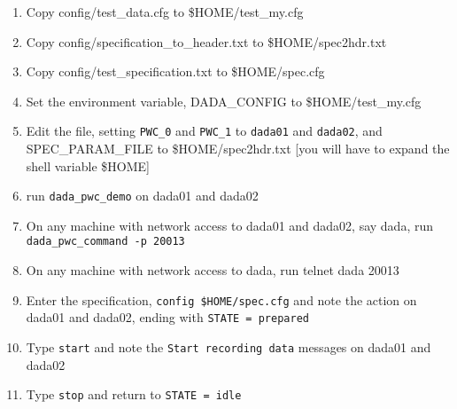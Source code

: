 \begin{enumerate}

\item Copy config/test\_data.cfg to \$HOME/test\_my.cfg

\item Copy config/specification\_to\_header.txt to \$HOME/spec2hdr.txt

\item Copy config/test\_specification.txt to \$HOME/spec.cfg

\item Set the environment variable, DADA\_CONFIG to \$HOME/test\_my.cfg

\item Edit the file, setting {\tt PWC\_0} and {\tt PWC\_1} to {\tt dada01}
	and {\tt dada02}, and SPEC\_PARAM\_FILE to \$HOME/spec2hdr.txt
        [you will have to expand the shell variable \$HOME]

\item run {\tt dada\_pwc\_demo} on dada01 and dada02

\item On any machine with network access to dada01 and dada02, say dada,
      run {\tt dada\_pwc\_command -p 20013}

\item On any machine with network access to dada, run {telnet dada 20013}

\item Enter the specification, {\tt config \$HOME/spec.cfg} and note
      the action on dada01 and dada02, ending with {\tt STATE = prepared}

\item Type {\tt start} and note the {\tt Start recording data} messages
      on dada01 and dada02

\item Type {\tt stop} and return to {\tt STATE = idle}

\end {enumerate}
